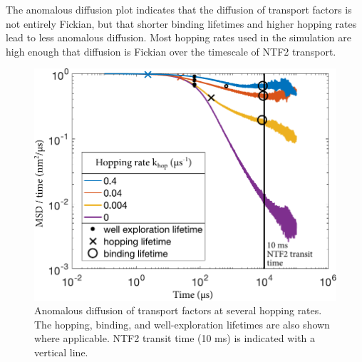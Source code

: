 The anomalous diffusion plot indicates that the diffusion of transport factors is not entirely Fickian, but that shorter binding lifetimes and higher hopping rates lead to less anomalous diffusion.  Most hopping rates used in the simulation are high enough that diffusion is Fickian over the timescale of NTF2 transport.

\begin{figure}
\centering
\includegraphics[width=0.5\linewidth]{figs/ch02/171103-DvsT-with-lifetimes.pdf}
\caption[Anomalous diffusion in the hopping simulation.]{Anomalous diffusion of transport factors at several hopping rates.  The hopping, binding, and well-exploration lifetimes are also shown where applicable.  NTF2 transit time (10 ms) is indicated with a vertical line.}
\label{fig:anomalous-diffusion}
\end{figure}

